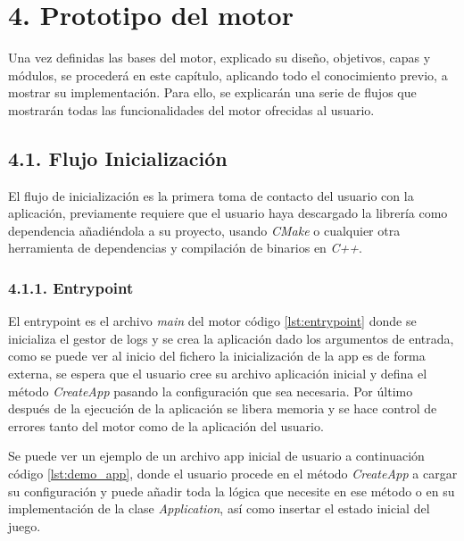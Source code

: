 \chapter*{4. Prototipo del motor}\label{cap:prototype}

Una vez definidas las bases del motor, explicado su diseño, objetivos, capas y módulos, se procederá en este 
capítulo, aplicando todo el conocimiento previo, a mostrar su implementación. Para ello, se explicarán una serie
de flujos que mostrarán todas las funcionalidades del motor ofrecidas al usuario.

\section*{4.1. Flujo Inicialización}\label{sec:workflow_init}

El flujo de inicialización es la primera toma de contacto del usuario con la aplicación, previamente requiere que el usuario
haya descargado la librería como dependencia añadiéndola a su proyecto, usando \textit{CMake}\cite{cmake-tutorial} o cualquier otra
herramienta de dependencias y compilación de binarios en \textit{C++}.

\subsection*{4.1.1. Entrypoint}\label{sec:workflow_init_entrypoint}
El entrypoint es el archivo \textit{main} del motor código \ref{lst:entrypoint} donde se inicializa el gestor de logs
y se crea la aplicación dado los argumentos de entrada, como se puede ver al inicio del fichero la inicialización de la app es de forma externa, se espera
que el usuario cree su archivo aplicación inicial y defina el método \textit{CreateApp} pasando la configuración que sea
necesaria. Por último después de la ejecución de la aplicación se libera memoria y se hace control de errores tanto del motor
como de la aplicación del usuario.


Se puede ver un ejemplo de un archivo app inicial de usuario a continuación código \ref{lst:demo_app}, donde
el usuario procede en el método \textit{CreateApp} a cargar su configuración y puede añadir toda la lógica que necesite
en ese método o en su implementación de la clase \textit{Application}, así como insertar el estado inicial del juego.


